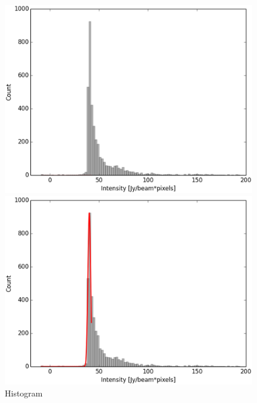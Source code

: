 \begin{figure}[htbp] 
\begin{center}
\begin{minipage}{0.98\textwidth} 
\begin{center}
\begin{minipage}{0.48\textwidth}
\begin{center}
\includegraphics[width=0.98\textwidth]{OrionKL/ex_histogram.eps}
\end{center}
\end{minipage}
\begin{minipage}{0.48\textwidth}
\begin{center}
\includegraphics[width=0.98\textwidth]{OrionKL/ex_histogram_fit.eps}
\end{center}
\end{minipage}
\end{center}
\end{minipage}

\caption{Histogram}
\end{center}
\end{figure}

